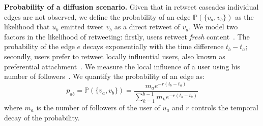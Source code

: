 \textbf{Probability of a diffusion scenario.}
Given that in retweet cascades individual edges are not observed,
we define the probability of an edge $\mathds{P}(\{v_a, v_b\})$ as the likelihood that $u_b$ emitted tweet $v_b$ as a direct retweet of $v_a$.
We model two factors in the likelihood of retweeting:
%
%
firstly, users retweet \emph{fresh} content~\cite{Wu2007}.
The probability of the edge $e$ decays exponentially with the time difference $t_b - t_a$;
secondly, users prefer to retweet locally influential users, also known as preferential attachment~\cite{Barabasi2005}.
We measure the local influence of a user using his number of followers~\cite{kwak2010twitter,Cha2010,Rizoiu2017}.
We quantify the probability of an edge as:
\begin{equation} \label{eq:prob-edge}
	p_{ab} = \mathds{P}(\{v_a, v_b\}) = \frac{m_a e^{-r({t_b-t_a})}}{\sum_{k=1}^{b-1} m_k e^{-r({t_b-t_k})}}
\end{equation}
where 
$m_a$ is the number of followers of the user of $u_a$ and
$r$ controls the temporal decay of the probability.

